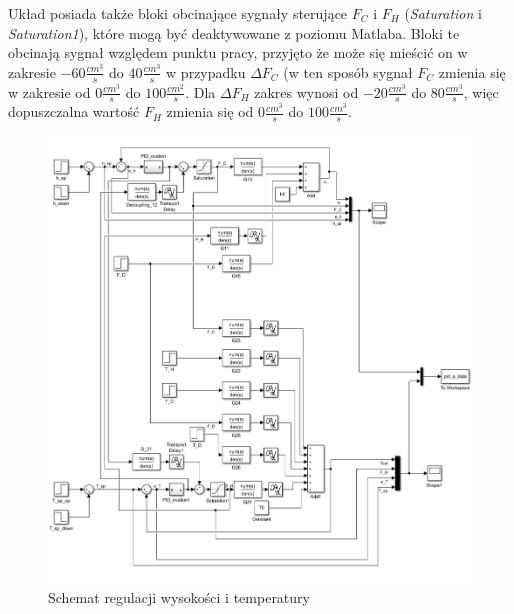 \documentclass{article}
\begin{document}
Układ posiada także bloki obcinające sygnały sterujące $F_C$ i $F_H$ (\textit{Saturation} i \textit{Saturation1}), które mogą być deaktywowane z poziomu Matlaba. Bloki te obcinają sygnał względem punktu pracy, przyjęto że może się mieścić on w zakresie $-60\frac{cm^3}{s}$ do $40\frac{cm^3}{s}$ w przypadku $\Delta F_C$ (w ten sposób sygnał $F_C$ zmienia się w zakresie od $0\frac{cm^3}{s}$ do $100\frac{cm^2}{s}$. Dla $\Delta F_H$ zakres wynosi od $-20\frac{cm^3}{s}$ do $80\frac{cm^3}{s}$, więc dopuszczalna wartość $F_H$ zmienia się od $0\frac{cm^3}{s}$ do $100\frac{cm^3}{s}$.
\begin{figure}[!htb]
	\centering
	\includegraphics[width=1.1\textwidth]{pid_schemat.PNG}
	\caption{Schemat regulacji wysokości i temperatury}
	\label{fig::pid_schemat}
\end{figure}

\newpage
\end{document}
